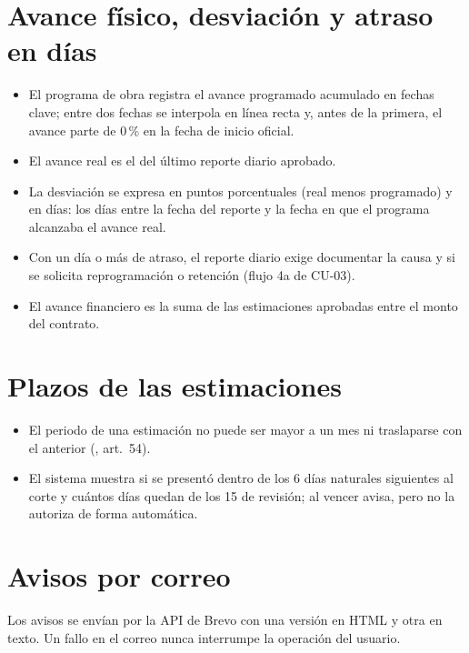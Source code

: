 \section{Avance físico, desviación y atraso en días}
\begin{itemize}
  \item El programa de obra registra el avance programado acumulado en fechas clave; entre dos fechas se interpola en línea recta y, antes de la primera, el avance parte de 0\,\% en la fecha de inicio oficial.
  \item El avance real es el del último reporte diario aprobado.
  \item La desviación se expresa en puntos porcentuales (real menos programado) y en días: los días entre la fecha del reporte y la fecha en que el programa alcanzaba el avance real.
  \item Con un día o más de atraso, el reporte diario exige documentar la causa y si se solicita reprogramación o retención (flujo 4a de CU-03).
  \item El avance financiero es la suma de las estimaciones aprobadas entre el monto del contrato.
\end{itemize}

\section{Plazos de las estimaciones}
\begin{itemize}
  \item El periodo de una estimación no puede ser mayor a un mes ni traslaparse con el anterior (\ley, art.~54).
  \item El sistema muestra si se presentó dentro de los 6 días naturales siguientes al corte y cuántos días quedan de los 15 de revisión; al vencer avisa, pero no la autoriza de forma automática.
\end{itemize}

\section{Avisos por correo}
Los avisos se envían por la API de Brevo con una versión en HTML y otra en texto. Un fallo en el correo nunca interrumpe la operación del usuario.

